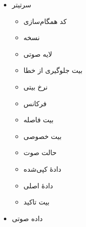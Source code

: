  
 \begin{itemize}
        \item سرتیتر
        \begin{multicols}{2}
                \begin{itemize}
                        \item کد همگام‌سازی
                        \item نسخه
                        \item لایه صوتی
                        \item بیت جلوگیری از خطا
                        \item نرخ بیتی
                        \item فرکانس
                        \item بیت فاصله
                        \item بیت خصوصی
                        \item حالت صوت
                        \item دادهٔ کپی‌شده
                        \item دادهٔ اصلی
                        \item بیت تاکید
                \end{itemize}
        \end{multicols}
                \item داده صوتی
 \end{itemize}
